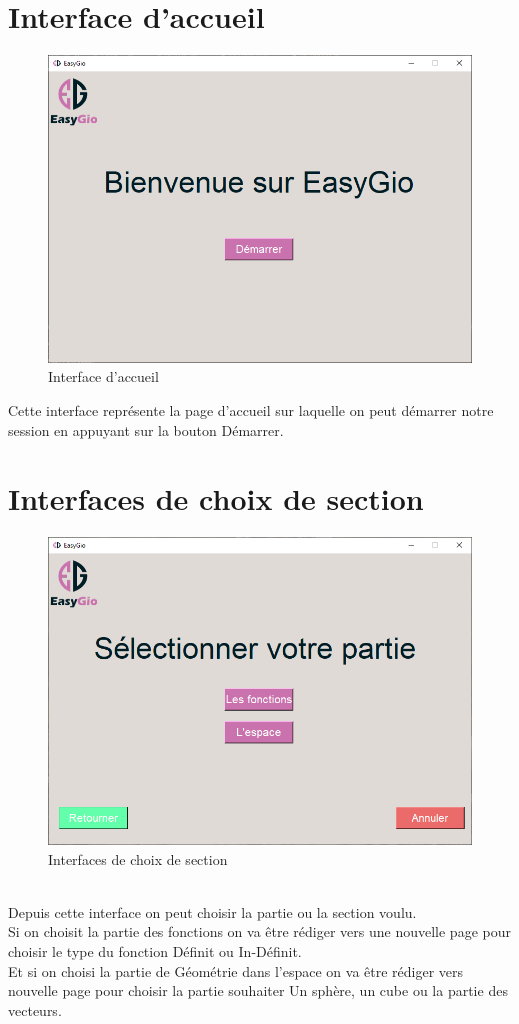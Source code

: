 \documentclass[a4paper]{report}
\begin{document}
\section{Interface d'accueil}
\begin{figure}[!h]
    \centering
    \includegraphics[width=15cm]{images/Interface1.PNG}
    \caption{Interface d'accueil}
    \label{fig:Interface d'accueil}
\end{figure}
Cette interface représente la page d'accueil sur laquelle on peut démarrer notre session en appuyant sur la bouton Démarrer.
\newpage
\section{Interfaces de choix de section}
\begin{figure}[!h]
    \centering
    \includegraphics[width=12cm]{images/Interface2.PNG}
    \caption{Interfaces de choix de section}
    \label{fig:Interfaces de choix de section}
\end{figure}\\
Depuis cette interface on peut choisir la partie ou la section voulu.\\
Si on choisit la partie des fonctions on va être rédiger vers une nouvelle page pour choisir le type du fonction Définit ou In-Définit.\\
Et si on choisi la partie de Géométrie dans l'espace on va être rédiger vers nouvelle page pour choisir la partie souhaiter Un sphère, un cube ou la partie des vecteurs.
\end{document}
